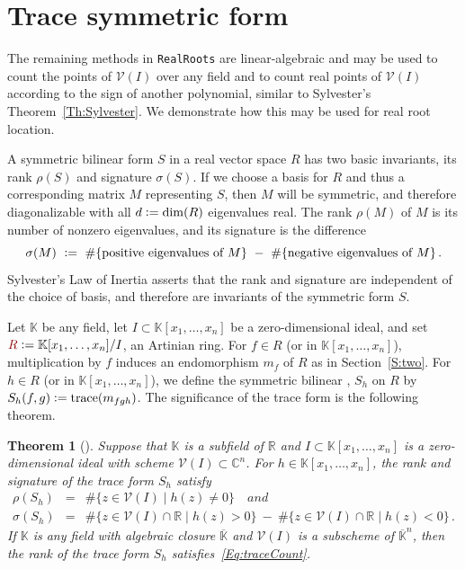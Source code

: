 \documentclass[12pt]{amsart}
\newtheorem{theorem}{Theorem}
\theoremstyle{definition}
\newcommand{\CC}{\mathbb{C}}
\newcommand{\RR}{\mathbb{R}}
\newcommand{\KK}{\mathbb{K}}
\newcommand{\calV}{\mathcal{V}}
\newcommand{\defcolor}[1]{{\color{TAMU}#1}}
\newcommand{\demph}[1]{\defcolor{{\sl #1}}}
\begin{document}
\section{Trace symmetric form}\label{S:three}
%
%
The remaining methods in \texttt{RealRoots} are linear-algebraic and may be used to count the points of $\calV(I)$ over any
field and to count real points of $\calV(I)$ according to 
the sign of another polynomial, similar to Sylvester's Theorem~\ref{Th:Sylvester}.
We demonstrate how this may be used for real root location.

A symmetric bilinear form \defcolor{$S$} in a real vector space $R$ has two basic invariants, its rank \defcolor{$\rho(S)$} and signature
\defcolor{$\sigma(S)$}.
If we choose a basis for $R$ and thus a corresponding matrix $M$ representing $S$, then $M$ will be symmetric, and therefore 
diagonalizable with all $d\vcentcolon = \dim(R)$ eigenvalues real.
The rank $\rho(M)$ of $M$ is its number of nonzero eigenvalues, and its signature  is the difference
\[
\sigma(M)\ \vcentcolon =\ \#\{\mbox{positive eigenvalues of $M$}\}
\ -\ \#\{\mbox{negative eigenvalues of $M$}\}\,.
\]
Sylvester's Law of Inertia asserts that the rank and signature are independent of the choice of basis, and therefore are invariants of the
symmetric form $S$.

Let $\KK$ be any field, let $I\subset\KK[x_1,\dotsc,x_n]$ be a zero-dimensional ideal, and set
$\defcolor{R}\vcentcolon=\KK[x_1,\dotsc,x_n]/I$, an  Artinian ring.    
For $f\in R$ (or in $\KK[x_1,\dotsc,x_n]$), multiplication by $f$ induces an endomorphism $m_f$ of $R$ as in Section~\ref{S:two}.
For $h\in R$ (or in $\KK[x_1,\dotsc,x_n]$), we define the symmetric bilinear \demph{trace form}, \defcolor{$S_h$} on $R$ by
$S_h(f,g)\vcentcolon= \mbox{trace}(m_{fgh})$.
The significance of the trace form is the following theorem.

\begin{theorem}[]
  Suppose that $\KK$ is a subfield of $\RR$ and $I\subset\KK[x_1,\dotsc,x_n]$ is a zero-dimensional ideal with scheme
  $\calV(I)\subset\CC^n$.
  For $h\in\KK[x_1,\dotsc,x_n]$, the rank and signature of the trace form $S_h$ satisfy
  \begin{eqnarray}
    \rho(S_h)&=&    \label{Eq:traceCount}
      \#\{ z \in \calV(I) \mid h(z)\neq 0\} \quad and  \\
    \sigma(S_h)&=&
        \#\{ z \in \calV(I)\cap\RR \mid h(z)> 0\} \ -\  \nonumber
        \#\{ z \in \calV(I)\cap\RR \mid h(z)< 0\} \,.
  \end{eqnarray}
  If $\KK$ is any field with algebraic closure $\overline{\KK}$ and $\calV(I)$ is a subscheme of $\overline{\KK}^n$, then 
  the rank of the trace form $S_h$ satisfies~\eqref{Eq:traceCount}.
\end{theorem}
\end{document}
